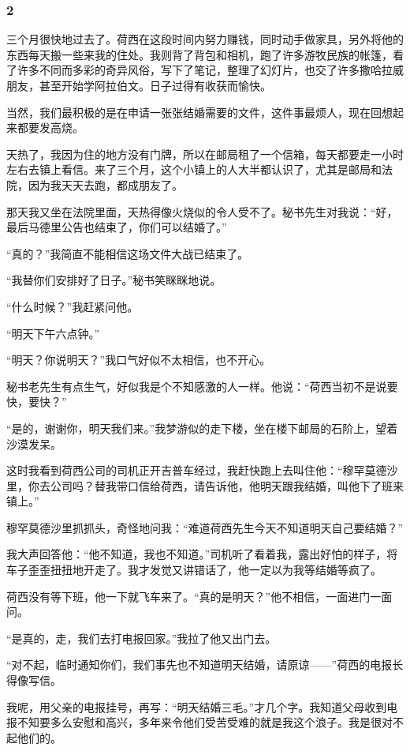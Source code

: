 \subsubsection*{2}
\par 三个月很快地过去了。荷西在这段时间内努力赚钱，同时动手做家具，另外将他的东西每天搬一些来我的住处。我则背了背包和相机，跑了许多游牧民族的帐篷，看了许多不同而多彩的奇异风俗，写下了笔记，整理了幻灯片，也交了许多撒哈拉威朋友，甚至开始学阿拉伯文。日子过得有收获而愉快。
\par 当然，我们最积极的是在申请一张张结婚需要的文件，这件事最烦人，现在回想起来都要发高烧。
\par 天热了，我因为住的地方没有门牌，所以在邮局租了一个信箱，每天都要走一小时左右去镇上看信。来了三个月，这个小镇上的人大半都认识了，尤其是邮局和法院，因为我天天去跑，都成朋友了。
\par 那天我又坐在法院里面，天热得像火烧似的令人受不了。秘书先生对我说：“好，最后马德里公告也结束了，你们可以结婚了。”
\par “真的？”我简直不能相信这场文件大战已结束了。
\par “我替你们安排好了日子。”秘书笑眯眯地说。
\par “什么时候？”我赶紧问他。
\par “明天下午六点钟。”
\par “明天？你说明天？”我口气好似不太相信，也不开心。
\par 秘书老先生有点生气，好似我是个不知感激的人一样。他说：“荷西当初不是说要快，要快？”
\par “是的，谢谢你，明天我们来。”我梦游似的走下楼，坐在楼下邮局的石阶上，望着沙漠发呆。
\par 这时我看到荷西公司的司机正开吉普车经过，我赶快跑上去叫住他：“穆罕莫德沙里，你去公司吗？替我带口信给荷西，请告诉他，他明天跟我结婚，叫他下了班来镇上。”
\par 穆罕莫德沙里抓抓头，奇怪地问我：“难道荷西先生今天不知道明天自己要结婚？”
\par 我大声回答他：“他不知道，我也不知道。”司机听了看着我，露出好怕的样子，将车子歪歪扭扭地开走了。我才发觉又讲错话了，他一定以为我等结婚等疯了。
\par 荷西没有等下班，他一下就飞车来了。“真的是明天？”他不相信，一面进门一面问。
\par “是真的，走，我们去打电报回家。”我拉了他又出门去。
\par “对不起，临时通知你们，我们事先也不知道明天结婚，请原谅——”荷西的电报长得像写信。
\par 我呢，用父亲的电报挂号，再写：“明天结婚三毛。”才几个字。我知道父母收到电报不知要多么安慰和高兴，多年来令他们受苦受难的就是我这个浪子。我是很对不起他们的。
